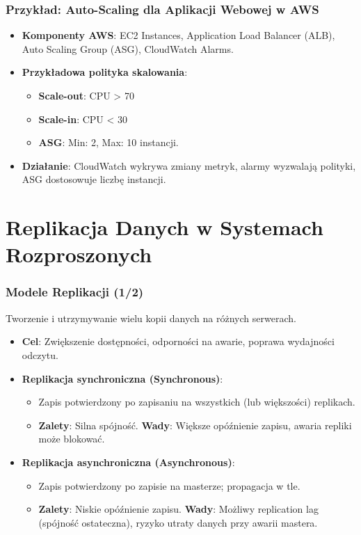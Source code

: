 \documentclass[aspectratio=169,xcolor=table]{beamer}
\begin{document}
\begin{frame}
  \frametitle{Przykład: Auto-Scaling dla Aplikacji Webowej w AWS}
  \begin{itemize}
    \item \textbf{Komponenty AWS}: EC2 Instances, Application Load Balancer (ALB), Auto Scaling Group (ASG), CloudWatch Alarms.
    \item \textbf{Przykładowa polityka skalowania}:
        \begin{itemize}
            \item \textbf{Scale-out}: CPU > 70%
            \item \textbf{Scale-in}: CPU < 30%
            \item \textbf{ASG}: Min: 2, Max: 10 instancji.
        \end{itemize}
    \item \textbf{Działanie}: CloudWatch wykrywa zmiany metryk, alarmy wyzwalają polityki, ASG dostosowuje liczbę instancji.
  \end{itemize}
\end{frame}

\section{Replikacja Danych w Systemach Rozproszonych}

\begin{frame}
  \frametitle{Modele Replikacji (1/2)}
  Tworzenie i utrzymywanie wielu kopii danych na różnych serwerach.
  \begin{itemize}
    \item \textbf{Cel}: Zwiększenie dostępności, odporności na awarie, poprawa wydajności odczytu.
    \item \textbf{Replikacja synchroniczna (Synchronous)}:
        \begin{itemize}
            \item Zapis potwierdzony po zapisaniu na wszystkich (lub większości) replikach.
            \item \textbf{Zalety}: Silna spójność. \textbf{Wady}: Większe opóźnienie zapisu, awaria repliki może blokować.
        \end{itemize}
    \item \textbf{Replikacja asynchroniczna (Asynchronous)}:
        \begin{itemize}
            \item Zapis potwierdzony po zapisie na masterze; propagacja w tle.
            \item \textbf{Zalety}: Niskie opóźnienie zapisu. \textbf{Wady}: Możliwy replication lag (spójność ostateczna), ryzyko utraty danych przy awarii mastera.
        \end{itemize}
  \end{itemize}
\end{frame}
\end{document}

